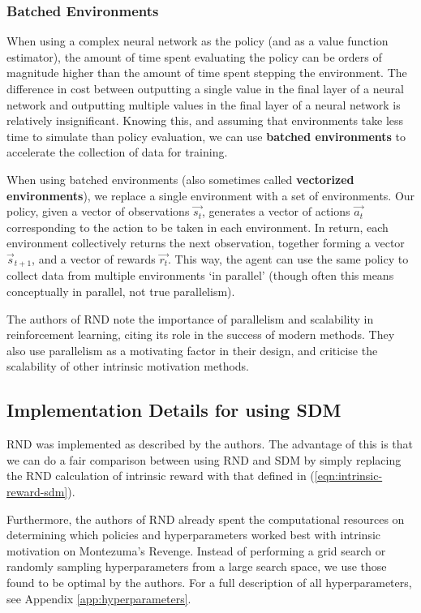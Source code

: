 \documentclass[journal, onecolumn, 12pt, draftclsnofoot]{IEEEtran}
\newcommand{\kword}[1]{\textbf{#1}}
\begin{document}
	\subsubsection{Batched Environments}
	\par When using a complex neural network as the policy (and as a value function estimator), the amount of time spent evaluating the policy can be orders of magnitude higher than the amount of time spent stepping the environment. The difference in cost between outputting a single value in the final layer of a neural network and outputting multiple values in the final layer of a neural network is relatively insignificant. Knowing this, and assuming that environments take less time to simulate than policy evaluation, we can use \kword{batched environments} to accelerate the collection of data for training.
	\par When using batched environments (also sometimes called \kword{vectorized environments}), we replace a single environment with a set of environments. Our policy, given a vector of observations $\vec{s_t}$, generates a vector of actions $\vec{a_t}$ corresponding to the action to be taken in each environment. In return, each environment collectively returns the next observation, together forming a vector $\vec{s}_{t+1}$, and a vector of rewards $\vec{r_t}$. This way, the agent can use the same policy to collect data from multiple environments `in parallel' (though often this means conceptually in parallel, not true parallelism).
	\par The authors of RND note the importance of parallelism and scalability in reinforcement learning, citing its role in the success of modern methods. They also use parallelism as a motivating factor in their design, and criticise the scalability of other intrinsic motivation methods.

	\subsection{Implementation Details for using SDM}
	\par RND was implemented as described by the authors. The advantage of this is that we can do a fair comparison between using RND and SDM by simply replacing the RND calculation of intrinsic reward with that defined in (\ref{eqn:intrinsic-reward-sdm}).
	\par Furthermore, the authors of RND already spent the computational resources on determining which policies and hyperparameters worked best with intrinsic motivation on Montezuma's Revenge. Instead of performing a grid search or randomly sampling hyperparameters from a large search space, we use those found to be optimal by the authors. For a full description of all hyperparameters, see Appendix \ref{app:hyperparameters}.
\end{document}
